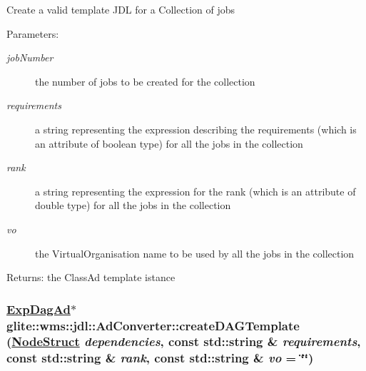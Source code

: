 Create a valid template JDL for a Collection of jobs \begin{Desc}
\item[Parameters:]
\begin{description}
\item[{\em job\-Number}]the number of jobs to be created for the collection \item[{\em requirements}]a string representing the expression describing the requirements (which is an attribute of boolean type) for all the jobs in the collection \item[{\em rank}]a string representing the expression for the rank (which is an attribute of double type) for all the jobs in the collection \item[{\em vo}]the Virtual\-Organisation name to be used by all the jobs in the collection \end{description}
\end{Desc}
\begin{Desc}
\item[Returns:]the Class\-Ad template istance\end{Desc}
\hypertarget{classglite_1_1wms_1_1jdl_1_1AdConverter_z21_5}{
\subsubsection[createDAGTemplate]{\setlength{\rightskip}{0pt plus 5cm}\hyperlink{classglite_1_1wms_1_1jdl_1_1ExpDagAd}{Exp\-Dag\-Ad}$\ast$ glite::wms::jdl::Ad\-Converter::create\-DAGTemplate (\hyperlink{structglite_1_1wms_1_1jdl_1_1NodeStruct}{Node\-Struct} {\em dependencies}, const std::string \& {\em requirements}, const std::string \& {\em rank}, const std::string \& {\em vo} = \char`\"{}\char`\"{})}}
\label{classglite_1_1wms_1_1jdl_1_1AdConverter_z21_5}


